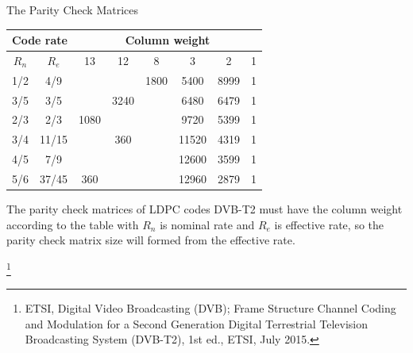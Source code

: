 \documentclass[11pt, aspectratio=169]{beamer}
\newcommand\blfootnote[1]{%
  \begingroup
  \renewcommand\thefootnote{}\footnote{#1}%
  \addtocounter{footnote}{-1}%
  \endgroup
}
\begin{document}
\begin{frame}{The Parity Check Matrices }
\vspace{-0.5cm}
\begin{table}
\renewcommand{\figurename}{Table}
	\centering 
				\label{table:dvb-t2lite}
	\begin{tabular}{|c|c|c|c|c|c|c|c|}
		\hline
		\multicolumn{2}{|c|}{Code rate} & \multicolumn{6}{c|}{Column weight}    \\ \hline
		$R_n$  & $R_e$  & 13   & 12   & 8    & 3     & 2    & 1 \\ \hline
		1/2           & 4/9             &      &      & 1800 & 5400  & 8999 & 1 \\ \hline
		3/5           & 3/5             &      & 3240 &      & 6480  & 6479 & 1 \\ \hline
		2/3           & 2/3             & 1080 &      &      & 9720  & 5399 & 1 \\ \hline
		3/4           & 11/15           &      & 360  &      & 11520 & 4319 & 1 \\ \hline
		4/5           & 7/9             &      &      &      & 12600 & 3599 & 1 \\ \hline
		5/6           & 37/45           & 360  &      &      & 12960 & 2879 & 1 \\ \hline
	\end{tabular}


\end{table}


The parity check matrices of LDPC codes DVB-T2 must have the column weight according to the table with $R_n$ is nominal rate and $R_e$ is effective rate, so the parity check matrix size will formed from the effective rate.

\blfootnote{\tiny{ETSI, Digital Video Broadcasting (DVB); Frame Structure Channel Coding and Modulation for a Second Generation Digital Terrestrial Television Broadcasting System (DVB-T2), 1st ed., ETSI, July 2015.}}
\end{frame}
\end{document}

